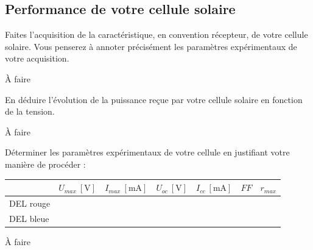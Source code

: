 \documentclass[twoside,a4paper,11pt,addpoints,answers]{exam}%
\newcounter{foo} %
\begin{document}
\subsection{Performance de votre cellule solaire}



\begin{questions}
\setcounter{question}{\thefoo}
\question[2] Faites l'acquisition de la caractéristique, en convention récepteur, de votre cellule solaire. Vous penserez à annoter précisément les paramètres expérimentaux de votre acquisition.

\begin{mybox}
\begin{solution}[5cm]

\`{A} faire

\end{solution}
\end{mybox}

\question[1] En déduire l'évolution de la puissance reçue par votre cellule solaire en fonction de la tension.

\begin{mybox}
\begin{solution}[5cm]

\`{A} faire

\end{solution}
\end{mybox}

\question[3] Déterminer les paramètres expérimentaux de votre cellule en justifiant votre manière de procéder : 

\begin{center}
\begin{tabular}{C{2cm}C{2cm}C{2cm}C{2cm}C{2cm}C{2cm}C{2cm}}
\toprule
& $U_{max} ~ [\si{\volt}]$ & $I_{max} ~ [\si{\milli\ampere}]$ & $U_{oc} ~ [\si{\volt}]$ & $I_{cc} ~ [\si{\milli\ampere}]$ & $FF$ & $r_{max}$ \\
\midrule

DEL rouge & & & & & & \\
DEL bleue & & & & & & \\
\bottomrule
\end{tabular}
\end{center}

\begin{mybox}
\begin{solution}[5cm]

\`{A} faire

\end{solution}
\end{mybox}

\setcounter{foo}{\value{question}}
\end{questions} 
\end{document}
